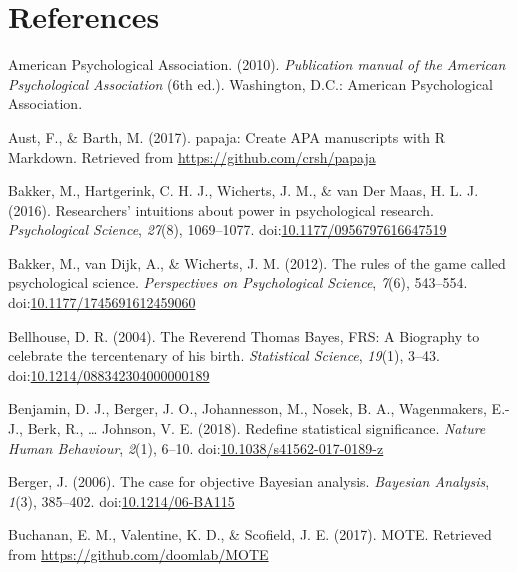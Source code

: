 \documentclass[,man, mask]{apa6}
\theoremstyle{definition}
\theoremstyle{definition}
\theoremstyle{definition}
\theoremstyle{remark}
\begin{document}
\newpage

\section{References}\label{references}

\setlength{\parindent}{-0.5in} \setlength{\leftskip}{0.5in}

\hypertarget{refs}{}
\hypertarget{ref-AmericanPsychologicalAssociation2010}{}
American Psychological Association. (2010). \emph{Publication manual of
the American Psychological Association} (6th ed.). Washington, D.C.:
American Psychological Association.

\hypertarget{ref-Aust2017}{}
Aust, F., \& Barth, M. (2017). papaja: Create APA manuscripts with R
Markdown. Retrieved from \url{https://github.com/crsh/papaja}

\hypertarget{ref-Bakker2016}{}
Bakker, M., Hartgerink, C. H. J., Wicherts, J. M., \& van Der Maas, H.
L. J. (2016). Researchers' intuitions about power in psychological
research. \emph{Psychological Science}, \emph{27}(8), 1069--1077.
doi:\href{https://doi.org/10.1177/0956797616647519}{10.1177/0956797616647519}

\hypertarget{ref-Bakker2012}{}
Bakker, M., van Dijk, A., \& Wicherts, J. M. (2012). The rules of the
game called psychological science. \emph{Perspectives on Psychological
Science}, \emph{7}(6), 543--554.
doi:\href{https://doi.org/10.1177/1745691612459060}{10.1177/1745691612459060}

\hypertarget{ref-Bellhouse2004}{}
Bellhouse, D. R. (2004). The Reverend Thomas Bayes, FRS: A Biography to
celebrate the tercentenary of his birth. \emph{Statistical Science},
\emph{19}(1), 3--43.
doi:\href{https://doi.org/10.1214/088342304000000189}{10.1214/088342304000000189}

\hypertarget{ref-Benjamin2017}{}
Benjamin, D. J., Berger, J. O., Johannesson, M., Nosek, B. A.,
Wagenmakers, E.-J., Berk, R., \ldots{} Johnson, V. E. (2018). Redefine
statistical significance. \emph{Nature Human Behaviour}, \emph{2}(1),
6--10.
doi:\href{https://doi.org/10.1038/s41562-017-0189-z}{10.1038/s41562-017-0189-z}

\hypertarget{ref-Berger2006}{}
Berger, J. (2006). The case for objective Bayesian analysis.
\emph{Bayesian Analysis}, \emph{1}(3), 385--402.
doi:\href{https://doi.org/10.1214/06-BA115}{10.1214/06-BA115}

\hypertarget{ref-Buchanan2017}{}
Buchanan, E. M., Valentine, K. D., \& Scofield, J. E. (2017). MOTE.
Retrieved from \url{https://github.com/doomlab/MOTE}
\end{document}
